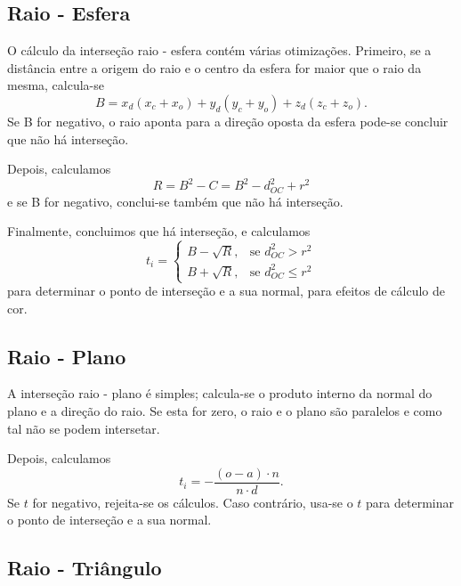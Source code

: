 \documentclass{article}
\begin{document}
    \subsection*{Raio - Esfera}

        \par
        O cálculo da interseção raio - esfera contém várias otimizações. Primeiro, se a distância entre a origem do raio e o centro da esfera for maior que o raio da mesma, calcula-se 
        $$ B = x_d (x_c + x_o) + y_d (y_c + y_o) + z_d (z_c + z_o). $$
        Se B for negativo, o raio aponta para a direção oposta da esfera pode-se concluir que não há interseção.
        \par
        Depois, calculamos $$ R = B^2 - C = B^2 - d^2_{OC} + r^2 $$ e se B for negativo, conclui-se também que não há interseção.
        \par
        Finalmente, concluimos que há interseção, e calculamos
        $$
            t_i =
            \begin{cases}
                B - \sqrt{R}, &\mbox{se } d^2_{OC} > r^2\\
                B + \sqrt{R}, &\mbox{se } d^2_{OC} \leq r^2 
            \end{cases}
        $$
        para determinar o ponto de interseção e a sua normal, para efeitos de cálculo de cor.
        

    \subsection*{Raio - Plano}
        \par
        A interseção raio - plano é simples; calcula-se o produto interno da normal do plano e a direção do raio. Se esta for zero, o raio e o plano são paralelos e como tal não se podem intersetar.
        \par
        Depois, calculamos
        $$
            t_i = -\frac{(o - a) \cdot n }{ n \cdot d}.
        $$
        Se $t$ for negativo, rejeita-se os cálculos. Caso contrário, usa-se o $t$ para determinar o ponto de interseção e a sua normal.
    \subsection*{Raio - Triângulo}
\end{document}
